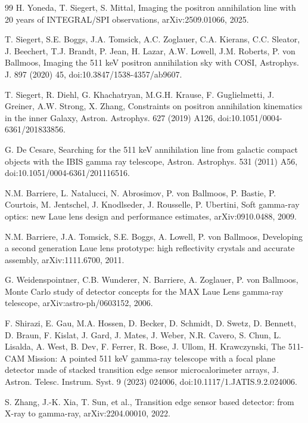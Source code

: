 \documentclass[11pt]{article}
\begin{document}
\begin{thebibliography}{99}
H. Yoneda, T. Siegert, S. Mittal, Imaging the positron annihilation line with 20 years of INTEGRAL/SPI observations, arXiv:2509.01066, 2025.

T. Siegert, S.E. Boggs, J.A. Tomsick, A.C. Zoglauer, C.A. Kierans, C.C. Sleator, J. Beechert, T.J. Brandt, P. Jean, H. Lazar, A.W. Lowell, J.M. Roberts, P. von Ballmoos, Imaging the 511 keV positron annihilation sky with COSI, Astrophys. J. 897 (2020) 45, doi:10.3847/1538-4357/ab9607.

T. Siegert, R. Diehl, G. Khachatryan, M.G.H. Krause, F. Guglielmetti, J. Greiner, A.W. Strong, X. Zhang, Constraints on positron annihilation kinematics in the inner Galaxy, Astron. Astrophys. 627 (2019) A126, doi:10.1051/0004-6361/201833856.

G. De Cesare, Searching for the 511 keV annihilation line from galactic compact objects with the IBIS gamma ray telescope, Astron. Astrophys. 531 (2011) A56, doi:10.1051/0004-6361/201116516.

N.M. Barriere, L. Natalucci, N. Abrosimov, P. von Ballmoos, P. Bastie, P. Courtois, M. Jentschel, J. Knodlseder, J. Rousselle, P. Ubertini, Soft gamma-ray optics: new Laue lens design and performance estimates, arXiv:0910.0488, 2009.

N.M. Barriere, J.A. Tomsick, S.E. Boggs, A. Lowell, P. von Ballmoos, Developing a second generation Laue lens prototype: high reflectivity crystals and accurate assembly, arXiv:1111.6700, 2011.

G. Weidenspointner, C.B. Wunderer, N. Barriere, A. Zoglauer, P. von Ballmoos, Monte Carlo study of detector concepts for the MAX Laue Lens gamma-ray telescope, arXiv:astro-ph/0603152, 2006.

F. Shirazi, E. Gau, M.A. Hossen, D. Becker, D. Schmidt, D. Swetz, D. Bennett, D. Braun, F. Kislat, J. Gard, J. Mates, J. Weber, N.R. Cavero, S. Chun, L. Lisalda, A. West, B. Dev, F. Ferrer, R. Bose, J. Ullom, H. Krawczynski, The 511-CAM Mission: A pointed 511 keV gamma-ray telescope with a focal plane detector made of stacked transition edge sensor microcalorimeter arrays, J. Astron. Telesc. Instrum. Syst. 9 (2023) 024006, doi:10.1117/1.JATIS.9.2.024006.

S. Zhang, J.-K. Xia, T. Sun, et al., Transition edge sensor based detector: from X-ray to gamma-ray, arXiv:2204.00010, 2022.


\end{thebibliography}
\end{document}
